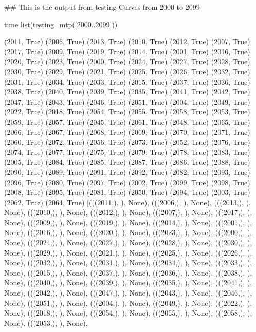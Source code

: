 ## This is the output from testing Curves from 2000 to 2099

time list(testing_mtp([2000..2099]))

(2011, True)
(2006, True)
(2013, True)
(2010, True)
(2012, True)
(2007, True)
(2017, True)
(2009, True)
(2019, True)
(2014, True)
(2001, True)
(2016, True)
(2020, True)
(2023, True)
(2000, True)
(2024, True)
(2027, True)
(2028, True)
(2030, True)
(2029, True)
(2021, True)
(2025, True)
(2026, True)
(2032, True)
(2031, True)
(2034, True)
(2033, True)
(2015, True)
(2037, True)
(2036, True)
(2038, True)
(2040, True)
(2039, True)
(2035, True)
(2041, True)
(2042, True)
(2047, True)
(2043, True)
(2046, True)
(2051, True)
(2004, True)
(2049, True)
(2022, True)
(2018, True)
(2054, True)
(2055, True)
(2058, True)
(2053, True)
(2059, True)
(2057, True)
(2045, True)
(2061, True)
(2048, True)
(2065, True)
(2066, True)
(2067, True)
(2068, True)
(2069, True)
(2070, True)
(2071, True)
(2060, True)
(2072, True)
(2056, True)
(2073, True)
(2052, True)
(2076, True)
(2074, True)
(2077, True)
(2075, True)
(2079, True)
(2078, True)
(2083, True)
(2005, True)
(2084, True)
(2085, True)
(2087, True)
(2086, True)
(2088, True)
(2090, True)
(2089, True)
(2091, True)
(2092, True)
(2082, True)
(2093, True)
(2096, True)
(2080, True)
(2097, True)
(2002, True)
(2099, True)
(2098, True)
(2008, True)
(2095, True)
(2081, True)
(2050, True)
(2094, True)
(2003, True)
(2062, True)
(2064, True)
[(((2011,), {}), None),
 (((2006,), {}), None),
 (((2013,), {}), None),
 (((2010,), {}), None),
 (((2012,), {}), None),
 (((2007,), {}), None),
 (((2017,), {}), None),
 (((2009,), {}), None),
 (((2019,), {}), None),
 (((2014,), {}), None),
 (((2001,), {}), None),
 (((2016,), {}), None),
 (((2020,), {}), None),
 (((2023,), {}), None),
 (((2000,), {}), None),
 (((2024,), {}), None),
 (((2027,), {}), None),
 (((2028,), {}), None),
 (((2030,), {}), None),
 (((2029,), {}), None),
 (((2021,), {}), None),
 (((2025,), {}), None),
 (((2026,), {}), None),
 (((2032,), {}), None),
 (((2031,), {}), None),
 (((2034,), {}), None),
 (((2033,), {}), None),
 (((2015,), {}), None),
 (((2037,), {}), None),
 (((2036,), {}), None),
 (((2038,), {}), None),
 (((2040,), {}), None),
 (((2039,), {}), None),
 (((2035,), {}), None),
 (((2041,), {}), None),
 (((2042,), {}), None),
 (((2047,), {}), None),
 (((2043,), {}), None),
 (((2046,), {}), None),
 (((2051,), {}), None),
 (((2004,), {}), None),
 (((2049,), {}), None),
 (((2022,), {}), None),
 (((2018,), {}), None),
 (((2054,), {}), None),
 (((2055,), {}), None),
 (((2058,), {}), None),
 (((2053,), {}), None),
